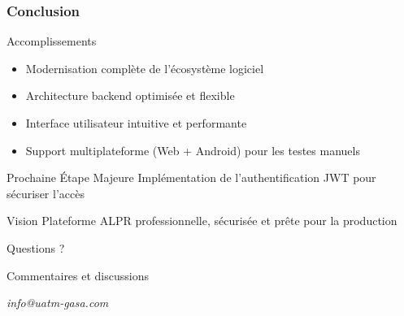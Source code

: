 \documentclass[
	11pt,
	aspectratio=169,
]{beamer}
\begin{document}
\begin{frame}
	\frametitle{Conclusion}
	
	\begin{block}{Accomplissements}
		\begin{itemize}
			\item Modernisation complète de l'écosystème logiciel
			\item Architecture backend optimisée et flexible
			\item Interface utilisateur intuitive et performante
			\item Support multiplateforme (Web + Android) pour les testes manuels
		\end{itemize}
	\end{block}
	
	\smallskip
	
	\begin{exampleblock}{Prochaine Étape Majeure}
		\centering
		Implémentation de l'authentification JWT pour sécuriser l'accès
	\end{exampleblock}
	
	\smallskip
	
	\begin{alertblock}{Vision}
		\centering
		Plateforme ALPR professionnelle, sécurisée et prête pour la production
	\end{alertblock}
\end{frame}




\begin{frame}[plain]
	\begin{center}
		{\Huge Questions ?}
		
		\bigskip\bigskip
		
		{\LARGE Commentaires et discussions}
		
		\bigskip\bigskip
		
		\textit{info@uatm-gasa.com}
	\end{center}
\end{frame}

\end{document}
